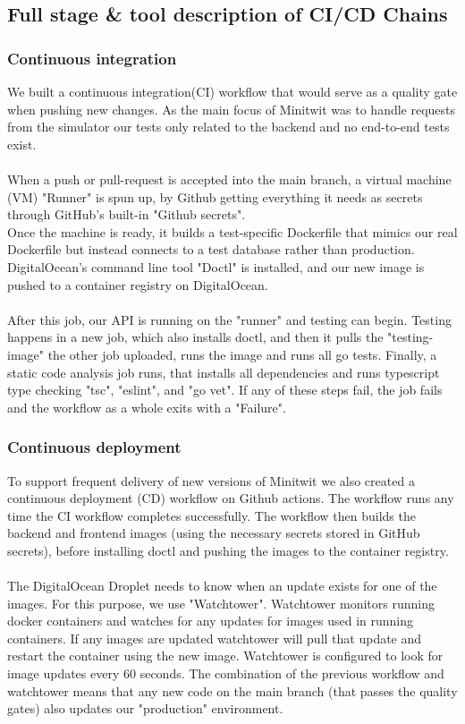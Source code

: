 \subsection{Full stage \& tool description of CI/CD Chains}
\subsubsection{Continuous integration}\label{subsubsec:ci}
We built a continuous integration(CI) workflow\cite{DevOps-CI-CDont} that would serve as a quality gate when pushing new changes. As the main focus of Minitwit was to handle requests from the simulator our tests only related to the backend and no end-to-end tests exist.\\\\
When a push or pull-request is accepted into the main branch, a virtual machine (VM) "Runner" is spun up, by Github getting everything it needs as secrets through GitHub's built-in "Github secrets"\cite{GitHub-Secrets}. \\ 
Once the machine is ready, it builds a test-specific Dockerfile that mimics our real Dockerfile but instead connects to a test database rather than production. DigitalOcean's command line tool "Doctl"\cite{DigitalOcean-doctl} is installed, and our new image is pushed to a container registry on  DigitalOcean.\\\\
After this job, our API is running on the "runner" and testing can begin. Testing happens in a new job, which also installs doctl, and then it pulls the "testing-image" the other job uploaded, runs the image and runs all go tests. Finally, a static code analysis job runs, that installs all dependencies and runs typescript type checking "tsc", "eslint", and "go vet". If any of these steps fail, the job fails and the workflow as a whole exits with a "Failure". 
\subsubsection{Continuous deployment}
To support frequent delivery of new versions of Minitwit we also created a continuous deployment (CD) workflow on Github actions. The workflow runs any time the CI workflow completes successfully. The workflow then builds the backend and frontend images (using the necessary secrets stored in GitHub secrets), before installing doctl and pushing the images to the container registry.\\\\
The DigitalOcean Droplet needs to know when an update exists for  one of the images. For this purpose, we use "Watchtower"\cite{watchtower}. Watchtower monitors running docker containers and watches for any updates for images used in running containers. If any images are updated watchtower will pull that update and restart the container using the new image. Watchtower is configured to look for image updates every 60 seconds. The combination of the previous workflow and watchtower means that any new code on the main branch (that passes the quality gates) also updates our "production" environment. 

